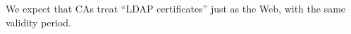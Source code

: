 


We expect that CAs treat  ``\gls{LDAP} certificates'' just as the Web, with the same validity period. 





